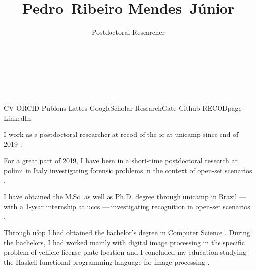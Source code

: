

\title{Pedro~Ribeiro Mendes~Júnior}

\author{Postdoctoral Researcher\\%
  \\%
  \\%
  \\%
  \\%
}
\date{}



\maketitle

\begin{tags}
  \gls{CV}
  \gls{ORCID}
  \gls{Publons}
  \gls{Lattes}
  \gls{GoogleScholar}
  \gls{ResearchGate}
  \gls{Github}
  \gls{RECODpage}
  \gls{LinkedIn}
\end{tags}

I work as a postdoctoral researcher at \gls{recod} of the \gls{ic} at \gls{unicamp} since end of 2019 .

For a great part of 2019, I have been in a short-time postdoctoral research at \gls{polimi} in Italy investigating forensic problems in the context of open-set scenarios .

I have obtained the M.Sc.  as well as Ph.D. degree  through \gls{unicamp} in Brazil --- with a 1-year internship at \gls{uccs} ---  investigating recognition in open-set scenarios .

Through \gls{ufop} I had obtained the bachelor's degree in Computer Science .
During the bachelors, I had worked mainly with digital image processing in the specific problem of vehicle license plate location  and I concluded my education studying the Haskell functional programming language for image processing .

